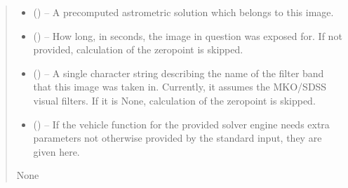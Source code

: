 \documentclass[letterpaper,11pt,english]{sphinxmanual}
\begin{document}
\begin{savenotes}
\begin{fulllineitems}
\begin{savenotes}
\begin{fulllineitems}
\begin{quote}
\begin{description}
\begin{itemize}
\item {} 
\sphinxAtStartPar
{} ({\hyperref[\detokenize{code/opihiexarata.astrometry.solution:opihiexarata.astrometry.solution.AstrometricSolution}]{}}\sphinxstyleliteralemphasis{\sphinxupquote{, }}) – A precomputed astrometric solution which belongs to this image.

\item {} 
\sphinxAtStartPar
{} (\sphinxstyleliteralemphasis{\sphinxupquote{, }}) – How long, in seconds, the image in question was exposed for. If
not provided, calculation of the zero\sphinxhyphen{}point is skipped.

\item {} 
\sphinxAtStartPar
{} (\sphinxstyleliteralemphasis{\sphinxupquote{, }}) – A single character string describing the name of the filter band that
this image was taken in. Currently, it assumes the MKO/SDSS visual
filters. If it is None, calculation of the zero\sphinxhyphen{}point is skipped.

\item {} 
\sphinxAtStartPar
{} () – If the vehicle function for the provided solver engine needs
extra parameters not otherwise provided by the standard input,
they are given here.

\end{itemize}

\sphinxAtStartPar
None

\end{description}\end{quote}

\end{fulllineitems}\end{savenotes}



\end{fulllineitems}
\end{savenotes}
\end{document}
